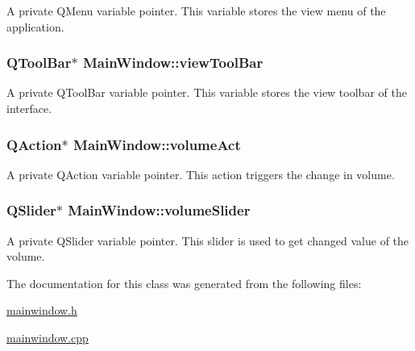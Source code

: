 \label{classMainWindow_a6e38d7c63a3dc537d05eafe7e0f5f4db}
A private QMenu variable pointer. This variable stores the view menu of the application. \hypertarget{classMainWindow_a246eb90b537ed23265d2dbffcc066aa8}{
\subsubsection[{viewToolBar}]{\setlength{\rightskip}{0pt plus 5cm}QToolBar$\ast$ {\bf MainWindow::viewToolBar}}}
\label{classMainWindow_a246eb90b537ed23265d2dbffcc066aa8}
A private QToolBar variable pointer. This variable stores the view toolbar of the interface. \hypertarget{classMainWindow_a5f67932fedfa9f47e727c6bcaf9b6d4d}{
\subsubsection[{volumeAct}]{\setlength{\rightskip}{0pt plus 5cm}QAction$\ast$ {\bf MainWindow::volumeAct}}}
\label{classMainWindow_a5f67932fedfa9f47e727c6bcaf9b6d4d}
A private QAction variable pointer. This action triggers the change in volume. \hypertarget{classMainWindow_afb5e35a5e0a66f1054aaa700829d6ff4}{
\subsubsection[{volumeSlider}]{\setlength{\rightskip}{0pt plus 5cm}QSlider$\ast$ {\bf MainWindow::volumeSlider}}}
\label{classMainWindow_afb5e35a5e0a66f1054aaa700829d6ff4}
A private QSlider variable pointer. This slider is used to get changed value of the volume. 

The documentation for this class was generated from the following files:\begin{DoxyCompactItemize}
\item 
\hyperlink{mainwindow_8h}{mainwindow.h}\item 
\hyperlink{mainwindow_8cpp}{mainwindow.cpp}\end{DoxyCompactItemize}
